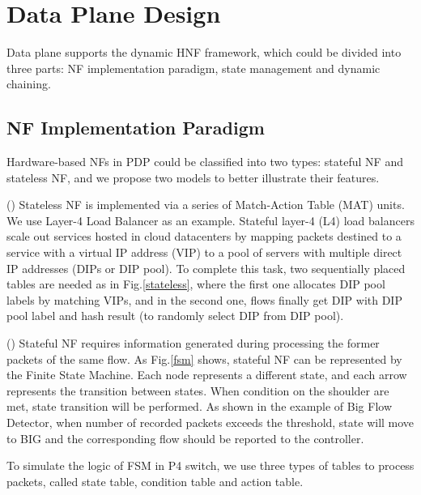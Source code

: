 \documentclass[10pt, conference, letterpaper]{IEEEtran}
\begin{document}

\section{Data Plane Design}
Data plane supports the dynamic HNF framework, which could be divided into three parts: NF implementation paradigm, state management and dynamic chaining.
\subsection{NF Implementation Paradigm}
Hardware-based NFs in PDP could be classified into two types: stateful NF and stateless NF, and we propose two models to better illustrate their features.

(\expandafter{}) Stateless NF is implemented via a series of Match-Action Table (MAT) units. We use Layer-4 Load Balancer as an example. Stateful layer-4 (L4) load balancers scale out services hosted in cloud datacenters by mapping packets destined to a service with a virtual IP address (VIP) to a pool of servers with multiple direct IP addresses (DIPs or DIP pool). 
To complete this task, two sequentially placed tables are needed as in Fig.\ref{stateless}, where the first one allocates DIP pool labels by matching VIPs, and in the second one, flows finally get DIP with DIP pool label and hash result (to randomly select DIP from DIP pool).


(\expandafter{}) Stateful NF requires information generated during processing the former packets of the same flow\cite{Gember-Jacobson2015}. As Fig.\ref{fsm} shows, stateful NF can be represented by the Finite State Machine. 
Each node represents a different state, and each arrow represents the transition between states. 
When condition on the shoulder are met, state transition will be performed. As shown in the example of Big Flow Detector, when number of recorded packets exceeds the threshold, state will move to BIG and the corresponding flow should be reported to the controller.

To simulate the logic of FSM in P4 switch, we use three types of tables to process packets, called state table, condition table and action table. 
\end{document}
